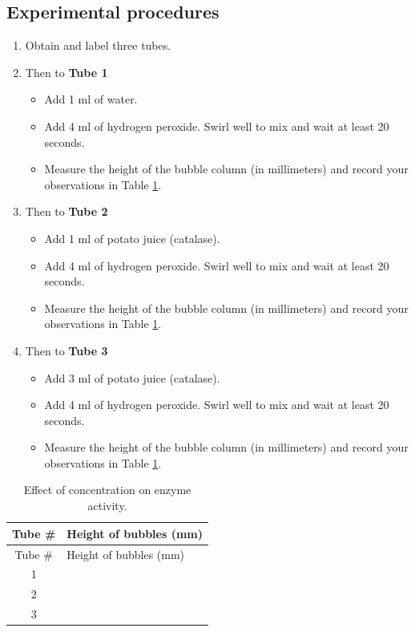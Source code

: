\documentclass[]{book}
\providecommand{\tightlist}{%
  \setlength{\itemsep}{0pt}\setlength{\parskip}{0pt}}
\theoremstyle{definition}
\theoremstyle{definition}
\theoremstyle{definition}
\theoremstyle{remark}
\begin{document}
\subsection{Experimental procedures}\label{experimental-procedures-22}

\begin{enumerate}
\def\labelenumi{\arabic{enumi}.}
\tightlist
\item
  Obtain and label three tubes.
\item
  Then to \textbf{Tube 1}

  \begin{itemize}
  \tightlist
  \item
    Add 1 ml of water.
  \item
    Add 4 ml of hydrogen peroxide. Swirl well to mix and wait at least
    20 seconds.
  \item
    Measure the height of the bubble column (in millimeters) and record
    your observations in Table \ref{tab:concentration}.
  \end{itemize}
\item
  Then to \textbf{Tube 2}

  \begin{itemize}
  \tightlist
  \item
    Add 1 ml of potato juice (catalase).
  \item
    Add 4 ml of hydrogen peroxide. Swirl well to mix and wait at least
    20 seconds.
  \item
    Measure the height of the bubble column (in millimeters) and record
    your observations in Table \ref{tab:concentration}.
  \end{itemize}
\item
  Then to \textbf{Tube 3}

  \begin{itemize}
  \tightlist
  \item
    Add 3 ml of potato juice (catalase).
  \item
    Add 4 ml of hydrogen peroxide. Swirl well to mix and wait at least
    20 seconds.
  \item
    Measure the height of the bubble column (in millimeters) and record
    your observations in Table \ref{tab:concentration}.
  \end{itemize}
\end{enumerate}

\begin{longtable}[]{@{}cl@{}}
\caption{\label{tab:concentration} Effect of concentration on enzyme
activity.}\tabularnewline
\toprule
Tube \# & Height of bubbles (mm)\tabularnewline
\midrule
\endfirsthead
\toprule
Tube \# & Height of bubbles (mm)\tabularnewline
\midrule
\endhead
1 &\tabularnewline
2 &\tabularnewline
3 &\tabularnewline
\bottomrule
\end{longtable}
\end{document}
